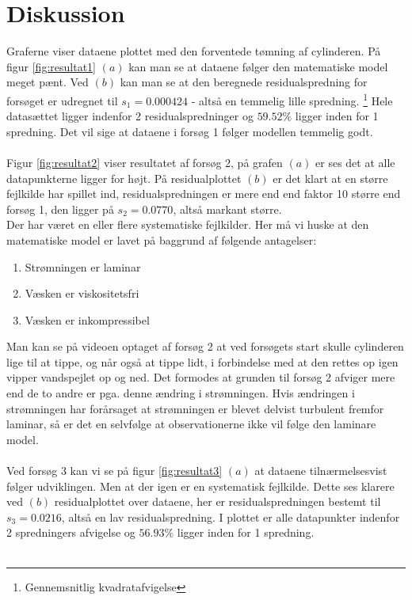 \documentclass[a4paper, 11pt]{article}
\begin{document}
\section{Diskussion}
Graferne viser dataene plottet med den forventede tømning af cylinderen. På figur \ref*{fig:resultat1} \((a)\) kan man se at dataene følger den matematiske model meget pænt. 
Ved \((b)\) kan man se at den beregnede residualspredning for forsøget er udregnet til \(s_1=0.000424\) - altså en temmelig lille spredning. \footnote{Gennemsnitlig kvadratafvigelse}
Hele datasættet ligger indenfor 2 residualspredninger og \(59.52\%\) ligger inden for 1 spredning. Det vil sige at dataene i forsøg 1 følger modellen temmelig godt.\\\\
Figur \ref*{fig:resultat2} viser resultatet af forsøg 2, på grafen \((a)\) er ses det at alle datapunkterne ligger for højt. På residualplottet \((b)\) er det klart at en større fejlkilde har spillet ind, residualspredningen er mere end end faktor 10 større end forsøg 1, den ligger på \(s_2=0.0770\), altså markant større.\\
Der har været en eller flere systematiske fejlkilder. Her må vi huske at den matematiske model er lavet på baggrund af følgende antagelser:
\begin{enumerate}
    \item Strømningen er laminar
    \item Væsken er viskositetsfri
    \item Væsken er inkompressibel
\end{enumerate}
Man kan se på videoen optaget af forsøg 2 at ved forsøgets start skulle cylinderen lige til at tippe, og når også at tippe lidt, i forbindelse med at den rettes op igen vipper vandspejlet op og ned. 
Det formodes at grunden til forsøg 2 afviger mere end de to andre er pga. denne ændring i strømningen.
Hvis ændringen i strømningen har forårsaget at strømningen er blevet delvist turbulent fremfor laminar, så er det en selvfølge at observationerne ikke vil følge den laminare model.\\\\
Ved forsøg 3 kan vi se på figur \ref*{fig:resultat3} \((a)\) at dataene tilnærmelsesvist følger udviklingen. Men at der igen er en systematisk fejlkilde. Dette ses klarere ved \((b)\) residualplottet over dataene, her er residualspredningen bestemt til \(s_3=0.0216\), altså en lav residualspredning. 
I plottet er alle datapunkter indenfor 2 spredningers afvigelse og \(56.93\%\) ligger inden for 1 spredning.\\\\
\end{document}
